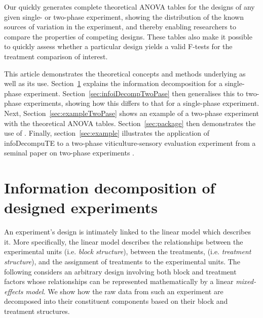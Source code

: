 \documentclass[article]{jss}
\begin{document}
Our  quickly generates complete theoretical ANOVA tables for the designs of any given single- or two-phase experiment, showing the distribution of the known sources of variation in the experiment, and thereby enabling researchers to compare the properties of competing designs. These tables also make it possible to quickly  assess whether a particular design yields a valid F-tests for the treatment comparison of interest.

This article demonstrates the theoretical concepts and methods underlying  as well as its use. Section~\ref{sec:infoDecomp} explains the information decomposition for a single-phase experiment. Section~\ref{sec:infoiDecompTwoPase} then generalises this to two-phase experiments, showing how this differs to that for a single-phase experiment. Next, Section~\ref{sec:exampleTwoPase} shows an example of a two-phase experiment with the theoretical ANOVA tables. Section~\ref{sec:package} then demonstrates the use of . Finally, section~\ref{sec:example} illustrates the application of infoDecompuTE to a two-phase viticulture-sensory evaluation experiment from a seminal paper on two-phase experiments \citep{Brien1999}.

\section{Information decomposition of designed experiments} 
\label{sec:infoDecomp}
An experiment's design is intimately linked to the linear model which describes it. More specifically, the linear model describes the relationships between the experimental units (i.e. \emph{block structure}), between the treatments, (i.e. \emph{treatment structure}), and the assignment of treatments to the experimental units. The following considers an arbitrary design involving both block and treatment factors whose relationships can be represented mathematically by a linear \emph{mixed-effects model}. We show how the raw data from such an experiment are decomposed into their constituent components based on their block and treatment structures.
\end{document}
